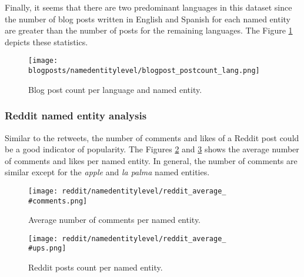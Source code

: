 \par Finally, it seems that there are two predominant languages in this dataset since the number of blog posts written in English and Spanish for each named entity are greater than the number of posts for the remaining languages. The Figure \ref{fig:blogposts_postcount_lang_entity} depicts these statistics.
\begin{figure}[H]
	\begin{center}
		\texttt{[image: blogposts/namedentitylevel/blogpost\_postcount\_lang.png]}
		\caption{Blog post count per language and named entity.}
		\label{fig:blogposts_postcount_lang_entity}
	\end{center}
\end{figure}



\subsubsection{Reddit named entity analysis}

\par Similar to the retweets, the number of comments and likes of a Reddit post could be a good indicator of popularity. The Figures \ref{fig:reddit_average_comments_entity} and \ref{fig:reddit_average_ups_entity} shows the average number of comments and likes per named entity. In general, the number of comments are similar except for the \textit{apple} and \textit{la palma} named entities.

\begin{figure}[H]
	\begin{center}
		\texttt{[image: reddit/namedentitylevel/reddit\_average\_\\\#comments.png]}
		\caption{Average number of comments per named entity.}
		\label{fig:reddit_average_comments_entity}
	\end{center}
\end{figure}

\begin{figure}[H]
	\begin{center}
		\texttt{[image: reddit/namedentitylevel/reddit\_average\_\\\#ups.png]}
		\caption{Reddit posts count per named entity.}
		\label{fig:reddit_average_ups_entity}
	\end{center}
\end{figure}

